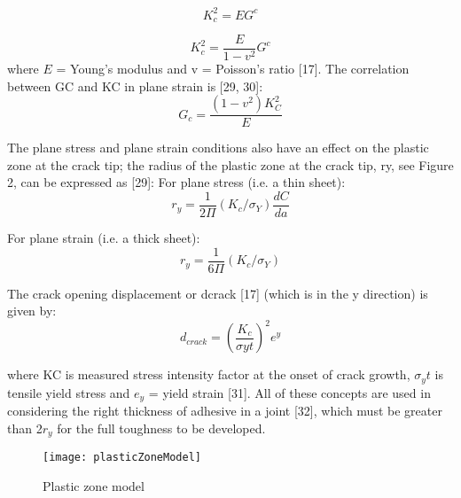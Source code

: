 \documentclass[numbers=noendperiod,chapterprefix=on]{icldt} %
\begin{document}
\begin{equation} \label{plane stress  [28]}
K_c^2=E G^c
\end{equation}

\begin{equation} \label{plane strain [28]}
K_c^2=\frac{E}{1-v^2} G^c
\end{equation}
where $E$ = Young’s modulus and v = Poisson’s ratio [17].
The correlation between GC and KC in plane strain is [29, 30]:
\begin{equation} \label{correlation [28]}
G_c = \frac{(1-v^2) K_C^2}{E} 
\end{equation}

The plane stress and plane strain conditions also have an effect on the plastic zone at the crack tip; the radius of the plastic zone at the crack tip, ry, see Figure 2, can be expressed as [29]:
For plane stress (i.e. a thin sheet):
\begin{equation} \label{ry plane stress [28]}
r_y=\frac{1}{2\Pi}(K_c/\sigma_Y) \frac{dC}{da}
\end{equation}

For plane strain (i.e. a thick sheet):
\begin{equation} \label{ry plane strain [28]}
r_y=\frac{1}{6\Pi}(K_c/\sigma_Y)
\end{equation}

The crack opening displacement or dcrack [17] (which is in the y direction) is given by: 
\begin{equation} 
d_{crack}=\left( \frac{K_c}{\sigma yt}\right) ^2 e^y
\end{equation}

where KC is measured stress intensity factor at the onset of crack growth,
$\sigma_yt$ is tensile yield stress and $e_y$ = yield strain [31].
All of these concepts are used in considering the right thickness of adhesive in a joint [32], which must be greater than 2$r_y$ for the full toughness to be developed. 

\begin{figure}[!htpb]
\centering
\texttt{[image: plasticZoneModel]}
\caption{Plastic zone model } 
\end{figure}
\end{document}
